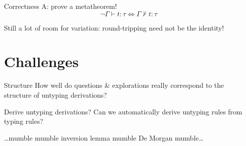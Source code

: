 \documentclass[xcolor=svgnames,12pt,aspectratio=169]{beamer}
\newcommand{\ty}[3]{{#1} \vdash {#2} : {#3}}
\newcommand{\nty}[3]{{#1} \nvdash {#2} : {#3}}
\newenvironment{xframe}[1][]
  {\begin{frame}[fragile,environment=xframe,#1]}
  {\end{frame}}
\begin{document}
\begin{xframe}{Correctness}
  A: prove a metatheorem!
  \[ \neg \ty \Gamma t \tau \iff \nty \Gamma t \tau \]



   Still a lot of room for variation: round-tripping need
  not be the identity!
\end{xframe}

\section{Challenges}

\begin{xframe}{Structure}
  How well do questions \& explorations really correspond to the
  structure of untyping derivations?
\end{xframe}

\begin{xframe}{Derive untyping derivations?}
  Can we automatically derive untyping rules from typing rules?
  \medskip

  {\scriptsize \dots mumble mumble inversion lemma mumble De Morgan mumble\dots}
\end{xframe}
\end{document}
